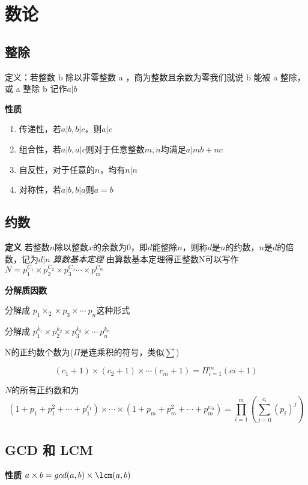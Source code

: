 \section{数论}

\subsection{整除}

定义：若整数 b 除以非零整数 a ，商为整数且余数为零我们就说 b 能被 a 整除，或 a 整除 b 记作$a|b$

\textbf{性质}
\begin{enumerate}
    \item 传递性，若$a|b,b|c$，则$a|c$
    \item 组合性，若$a|b,a|c$则对于任意整数$m,n$均满足$a|mb+nc$
    \item 自反性，对于任意的$n$，均有$n|n$
    \item 对称性，若$a|b,b|a$则$a=b$
\end{enumerate}

\subsection{约数}
\textbf{定义}
若整数$n$除以整数$x$的余数为$0$，即$d$能整除$n$，则称$d$是$n$的约数，$n$是$d$的倍数，记为$d|n$
\emph{算数基本定理}
由算数基本定理得正整数N可以写作$N=p_1^{C_1}\times p_2^{C_2} \times p_3^{C_3} \cdots \times p_m^{C_m}$

\textbf{分解质因数}

分解成 $p_{1}\times _{2}\times p_{3}\times \cdots \ p_{n}$这种形式


分解成 $p_{1}^{k_{1}} \times p_{2}^{k_{2}} \times p_{3}^{k_{3}} \times \cdots \ p_{n}^{k_{n}}$

N的正约数个数为($\Pi$是连乘积的符号，类似$\sum$)

\[
    (c_1+1)\times (c_2+1)\times \cdots (c_m+1)=\Pi_{i=1}^{m}(ci+1)
\]

$N$的所有正约数和为
\[
    (1+p_1+p_1^2+\cdots +p_1^{c_1})\times\cdots\times(1+p_m+p_m^2+\cdots +p_m^{c_m})=\prod_{i=1}^{m}(\sum_{j=0}^{c_i}(p_i)^j)
\]

\subsection{ GCD 和 LCM }

\textbf{性质} $a\times b = gcd(a,b)\times\lcm(a,b)$

